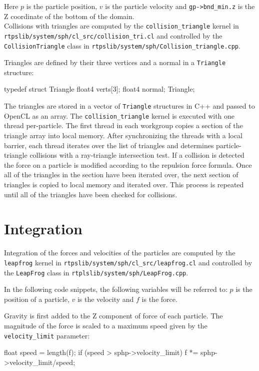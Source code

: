 Here $p$ is the particle position, $v$ is the particle velocity and
\verb|gp->bnd_min.z| is the Z coordinate of the bottom of the domain.
\\

Collisions with triangles are computed by the \verb|collision_triangle| kernel in
\\ \verb|rtpslib/system/sph/cl_src/collision_tri.cl| and controlled by the
\verb|CollisionTriangle| class in \verb|rtpslib/system/sph/Collision_triangle.cpp|.

Triangles are defined by their three vertices and a normal in a \verb|Triangle| structure:
\begin{cppcode}{0}
typedef struct Triangle
{
    float4 verts[3];
    float4 normal;
} Triangle;
\end{cppcode}

The triangles are stored in a vector of \verb|Triangle| structures in C++ and
passed to OpenCL as an array. The \verb|collision_triangle| kernel is executed
with one thread per-particle. The first thread in each workgroup copies a section of the
triangle array into local memory. After synchronizing the threads with a local
barrier, each thread iterates over the list of triangles and determines
particle-triangle collisions with a ray-triangle intersection
test.\cite{Ericson} If a collision is detected the force on a particle is
modified according to the repulsion force formula. Once all of the triangles in
the section have been iterated over, the next section of triangles is copied to
local memory and iterated over. This process is repeated until all of the
triangles have been checked for collisions.


\section{Integration}

Integration of the forces and velocities of the particles are computed by the
\verb|leapfrog| kernel in \verb|rtpslib/system/sph/cl_src/leapfrog.cl| and
controlled by the \verb|LeapFrog| class in
\verb|rtplslib/system/sph/LeapFrog.cpp|.

In the following code snippets, the following variables will be referred to:
$p$ is the position of a particle, $v$ is the velocity and $f$ is the force.


Gravity is first added to the Z component of force of each particle. The
magnitude of the force is scaled to a maximum speed given by the \verb|velocity_limit| parameter:
\begin{cppcode}{0}
float speed = length(f);
if (speed > sphp->velocity_limit) 
{
    f *= sphp->velocity_limit/speed;
}
\end{cppcode}

